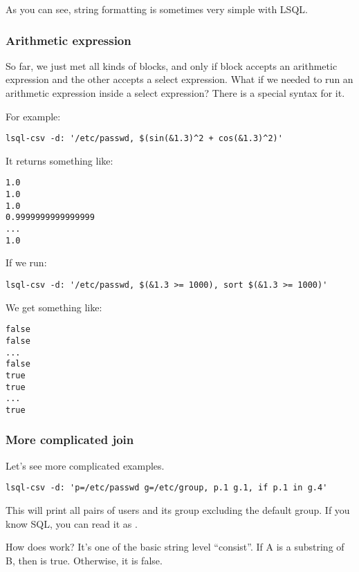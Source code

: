 As you can see, string formatting is sometimes very simple with LSQL.

\subsubsection{Arithmetic expression}
So far, we just met all kinds of blocks, and only if block accepts an arithmetic expression and the other accepts a select expression.
What if we needed to run an arithmetic expression inside a select expression? There is a special syntax \icode{\$(\ldots{})} for it.

For example:
\begin{verbatim}
lsql-csv -d: '/etc/passwd, $(sin(&1.3)^2 + cos(&1.3)^2)'
\end{verbatim}

It returns something like:
\begin{verbatim}
1.0
1.0
1.0
0.9999999999999999
...
1.0
\end{verbatim}

If we run:
\begin{verbatim}
lsql-csv -d: '/etc/passwd, $(&1.3 >= 1000), sort $(&1.3 >= 1000)'
\end{verbatim}

We get something like:
\begin{verbatim}
false
false
...
false
true
true
...
true
\end{verbatim}

\subsubsection{More complicated join}
Let's see more complicated examples.
\begin{verbatim}
lsql-csv -d: 'p=/etc/passwd g=/etc/group, p.1 g.1, if p.1 in g.4'
\end{verbatim}
This will print all pairs of users and its group excluding the default group. If you know SQL, you can read it as .

How does  work? It's one of the basic string level ``consist''. If A is a substring of B, then  is true. Otherwise, it is false.

